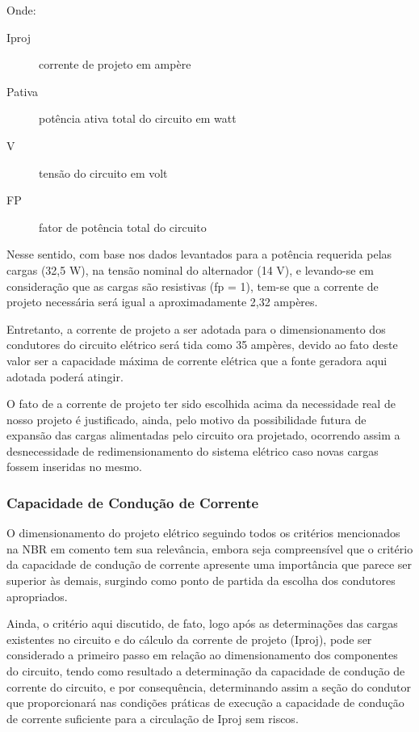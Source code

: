 Onde:
\begin{description}

\item [Iproj] corrente de projeto em ampère

\item [Pativa] potência ativa total do circuito em watt

\item [V] tensão do circuito em volt

\item [FP] fator de potência total do circuito
\end{description}

Nesse sentido, com base nos dados levantados para a potência requerida pelas cargas (32,5 W), na tensão nominal do alternador (14 V), e levando-se em consideração que as cargas são resistivas (fp = 1), tem-se que a corrente de projeto necessária será igual a aproximadamente 2,32 ampères.

Entretanto, a corrente de projeto a ser adotada para o dimensionamento dos condutores do circuito elétrico será tida como 35 ampères, devido ao fato deste valor ser a capacidade máxima de corrente elétrica que a fonte geradora aqui adotada poderá atingir.

O fato de a corrente de projeto ter sido escolhida acima da necessidade real de nosso projeto é justificado, ainda, pelo motivo da possibilidade futura de expansão das cargas alimentadas pelo circuito ora projetado, ocorrendo assim a desnecessidade de redimensionamento do sistema elétrico caso novas cargas fossem inseridas no mesmo.

\subsubsection{Capacidade de Condução de Corrente}

O dimensionamento do projeto elétrico seguindo todos os critérios mencionados na NBR em comento tem sua relevância, embora seja compreensível que o critério da capacidade de condução de corrente apresente uma importância que parece ser superior às demais, surgindo como ponto de partida da escolha dos condutores apropriados.

Ainda, o critério aqui discutido, de fato, logo após as determinações das cargas existentes no circuito e do cálculo da corrente de projeto (Iproj), pode ser considerado a primeiro passo em relação ao dimensionamento dos componentes do circuito, tendo como resultado a determinação da capacidade de condução de corrente do circuito, e por consequência, determinando assim a seção do condutor que proporcionará nas condições práticas de execução a capacidade de condução de corrente suficiente para a circulação de Iproj sem riscos.

